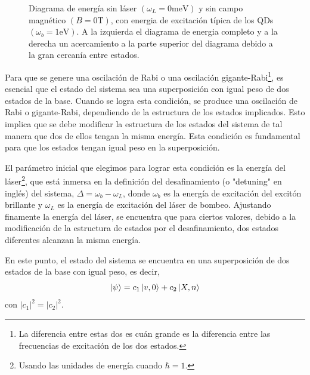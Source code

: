 \documentclass[main.tex]{subfiles}
\begin{document}
\begin{figure}[htbp]
	\caption{Diagrama de energ\'ia sin l\'aser $(\omega_L=0\text{meV})$ y sin campo magn\'etico $(B=0\text{T})$, con energia de excitaci\'on t\'ipica de los QDs $(\omega_b=1\text{eV})$. A la izquierda el diagrama de energia completo y a la derecha un acercamiento a la parte superior del diagrama debido a la gran cercan\'ia entre estados.}
\end{figure}

Para que se genere una oscilación de Rabi o una oscilación gigante-Rabi\footnote{La diferencia entre estas dos es cuán grande es la diferencia entre las frecuencias de excitación de los dos estados.}, es esencial que el estado del sistema sea una superposición con igual peso de dos estados de la base. Cuando se logra esta condición, se produce una oscilación de Rabi o gigante-Rabi, dependiendo de la estructura de los estados implicados. Esto implica que se debe modificar la estructura de los estados del sistema de tal manera que dos de ellos tengan la misma energía. Esta condición es fundamental para que los estados tengan igual peso en la superposición.

El parámetro inicial que elegimos para lograr esta condición es la energía del láser\footnote{Usando las unidades de energía cuando $\hbar =1$.}, que está inmersa en la definición del desafinamiento (o "detuning" en inglés) del sistema, $\Delta=\omega_b-\omega_L$, donde $\omega_b$ es la energía de excitación del excitón brillante y $\omega_L$ es la energía de excitación del láser de bombeo. Ajustando finamente la energía del láser, se encuentra que para ciertos valores, debido a la modificación de la estructura de estados por el desafinamiento, dos estados diferentes alcanzan la misma energía.

En este punto, el estado del sistema se encuentra en una superposición de dos estados de la base con igual peso, es decir,
\begin{equation}
	\ket{\psi} = c_1\ket{v,0} + c_2\ket{X,n}
\end{equation}
con $|c_1|^2=|c_2|^2$.
\end{document}
